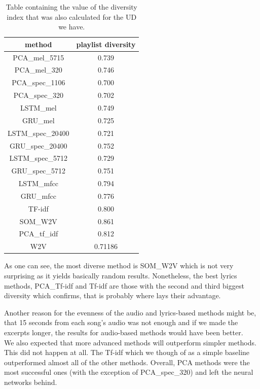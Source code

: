 \begin{table}[h]
\centering

\begin{tabu} to 1.7\textwidth {| c | c |}
\hline
\textbf{method} & \textbf{playlist diversity} \\
\hline
PCA\_mel\_5715 & 0.739 \\
\hline
PCA\_mel\_320 & 0.746 \\
\hline
PCA\_spec\_1106 & 0.700 \\
\hline
PCA\_spec\_320 & 0.702 \\
\hline
LSTM\_mel & 0.749 \\
\hline
GRU\_mel & 0.725 \\
\hline
LSTM\_spec\_20400 & 0.721 \\
\hline
GRU\_spec\_20400 &  0.752\\
\hline
LSTM\_spec\_5712 & 0.729 \\
\hline
GRU\_spec\_5712 &  0.751 \\
\hline
LSTM\_mfcc & 0.794 \\
\hline
GRU\_mfcc & 0.776 \\
\hline
TF-idf & 0.800 \\
\hline
SOM\_W2V & 0.861 \\
\hline
PCA\_tf\_idf & 0.812 \\
\hline
W2V & 0.71186 \\
\hline
\end{tabu} 
\caption{Table containing the value of the diversity index that was also calculated for the UD we have.}
\label{table:diversity_table}
\end{table}
As one can see, the most diverse method is SOM\_W2V which is not very surprising as it yields basically random results. Nonetheless, the best lyrics methods, PCA\_Tf-idf and Tf-idf are those with the second and third biggest diversity which confirms, that is probably where lays their advantage.

Another reason for the evenness of the audio and lyrics-based methods might be, that 15 seconds from each song's audio was not enough and if we made the excerpts longer, the results for audio-based methods would have been better. \\

We also expected that more advanced methods will outperform simpler methods. This did not happen at all. The Tf-idf which we though of as a simple baseline outperformed almost all of the other methods. Overall, PCA methods were the most successful ones (with the exception of PCA\_spec\_320) and left the neural networks behind. 

